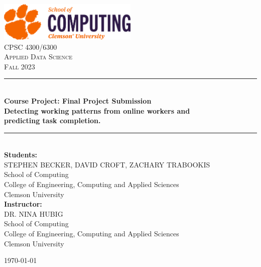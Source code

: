 \documentclass[11pt]{article}
\newcommand{\HRule}{\rule{\linewidth}{0.5mm}}
\begin{document}
 
%

\begin{titlepage}
  \begin{center}
    \includegraphics[width=0.5\textwidth]{figures/SoC-CU-Orange-and-Purple.png}~\\[2cm]

    \textsc{\Large CPSC 4300/6300 \\ Applied Data Science \\ Fall 2023}\\[1cm]


    \HRule \\[0.4cm]
    {\large \bfseries Course Project: Final Project Submission\\ Detecting working patterns from online workers and \\ predicting task completion. \\[0.4cm]}
    \HRule \\[2cm]
    
    \large\textbf{Students:}\\
    STEPHEN BECKER, DAVID CROFT, ZACHARY TRABOOKIS \\ School of Computing \\ College of Engineering, Computing and Applied Sciences \\ 
    Clemson University\\[1cm]

    \large\textbf{Instructor:}\\
    DR. NINA HUBIG  \\ School of Computing \\ College of Engineering, Computing and Applied Sciences \\ 
    Clemson University\\[1cm]

    \vfill

    {\large \today}

  \end{center}
\end{titlepage}

\rhead{\today}
 
\end{document}
